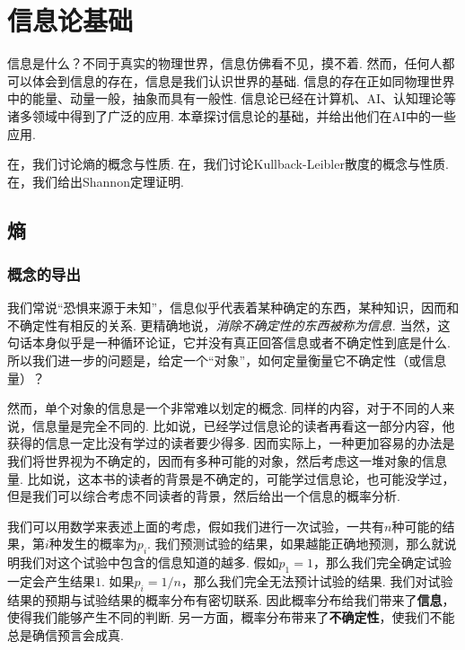 \chapter{信息论基础}\label{chap:information-theory}

信息是什么？不同于真实的物理世界，信息仿佛看不见，摸不着. 然而，任何人都可以体会到信息的存在，信息是我们认识世界的基础. 信息的存在正如同物理世界中的能量、动量一般，抽象而具有一般性. 信息论已经在计算机、AI、认知理论等诸多领域中得到了广泛的应用. 本章探讨信息论的基础，并给出他们在AI中的一些应用. 

在，我们讨论熵的概念与性质. 在，我们讨论Kullback-Leibler散度的概念与性质. 在，我们给出Shannon定理证明. 

\section{熵}\label{sec:entropy}


\subsection{概念的导出}

我们常说“恐惧来源于未知”，信息似乎代表着某种确定的东西，某种知识，因而和不确定性有相反的关系. 更精确地说，\emph{消除不确定性的东西被称为信息.} 当然，这句话本身似乎是一种循环论证，它并没有真正回答信息或者不确定性到底是什么. 所以我们进一步的问题是，给定一个“对象”，如何定量衡量它不确定性（或信息量）？

然而，单个对象的信息是一个非常难以划定的概念. 同样的内容，对于不同的人来说，信息量是完全不同的. 比如说，已经学过信息论的读者再看这一部分内容，他获得的信息一定比没有学过的读者要少得多. 因而实际上，一种更加容易的办法是我们将世界视为不确定的，因而有多种可能的对象，然后考虑这一堆对象的信息量. 比如说，这本书的读者的背景是不确定的，可能学过信息论，也可能没学过，但是我们可以综合考虑不同读者的背景，然后给出一个信息的概率分析. 

我们可以用数学来表述上面的考虑，假如我们进行一次试验，一共有$n$种可能的结果，第$i$种发生的概率为$p_i$. 我们预测试验的结果，如果越能正确地预测，那么就说明我们对这个试验中包含的信息知道的越多. 假如$p_1=1$，那么我们完全确定试验一定会产生结果$1$. 如果$p_i=1/n$，那么我们完全无法预计试验的结果. 我们对试验结果的预期与试验结果的概率分布有密切联系. 因此概率分布给我们带来了\textbf{信息}，使得我们能够产生不同的判断. 另一方面，概率分布带来了\textbf{不确定性}，使我们不能总是确信预言会成真. 

